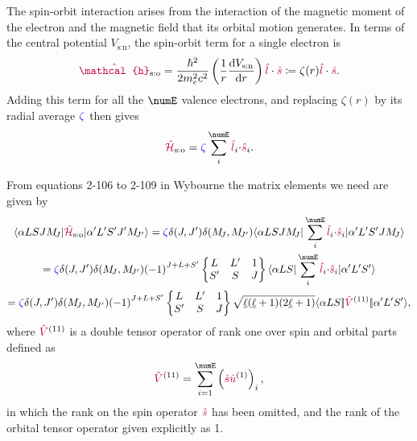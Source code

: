 \documentclass[11pt, twoside,openright]{article}
\begin{document}
	The spin-orbit interaction arises from the interaction of the magnetic moment of the electron and the magnetic field that its orbital motion generates. In terms of the central potential $V_{\text{s:n}}$, the spin-orbit term for a single electron is
    \begin{equation}
        \op{\mathcal{h}}_{\text{s:o}} = \frac{\hbar^2}{2\me^2 c^2} \left(\frac{1}{r}\frac{\mathrm{d}V_{\text{s:n}}}{\mathrm{d}r}\right)\op{l}\cdot{\op{s}} \DEF \zeta{(r)} \op{l}\cdot\op{s}.
    \end{equation}
    Adding this term for all the $\numE$ valence electrons, and replacing $\zeta(r)$ by its radial average $\textcolor{blue}{{\zeta}}$ then gives
    \begin{equation}
    \hamSpinOrbitSymbol = \spinZeta \sum_i^{\numE} \dotp{\op{l}_i}{\op{s}_i}.
    \end{equation}

    From equations 2-106 to 2-109 in Wybourne \cite{wybourne_electrostatic_1963} the matrix elements we need are given by
    \begin{multline} 
        \braopket{\alpha LSJ \Msub{J} }{\hamSpinOrbitSymbol}{\alpha' L'S'J'\Msub{J'}} = 
        \spinZeta
        \kronecker{J}{J'}
        \kronecker{\Msub{J}}{\Msub{J'}}
        \braopket{\alpha LSJ \Msub{J} }{\sum_i^{\numE} \dotp{\op{l}_i}{\op{s}_i}}{\alpha' L'S'J\Msub{J}} \\ 
        = \spinZeta \kronecker{J}{J'}
        \kronecker{\Msub{J}}{\Msub{J'}} \phaser{J+L+S'} 
            \sixj{L}{L'}{1}{S'}{S}{J} 
            \braopket{\alpha LS}{\sum_i^{\numE} \dotp{\op{l}_i}{\op{s}_i}}{\alpha' L'S'} \\
        = \spinZeta \kronecker{J}{J'}
        \kronecker{\Msub{J}}{\Msub{J'}} \phaser{J+L+S'} 
            \sixj{L}{L'}{1}{S'}{S}{J} 
            \sqrt{\lorb (\lorb + 1)(2\lorb + 1)} 
            \redbraopket{\alpha{LS}}{\op{V}^{(11)}}{\alpha'L'S'},
    \end{multline}
where $\textcolor{purple}{\hat{V}}^{(11)}$ is a double tensor operator of rank one over spin and orbital parts defined as 
    \begin{equation}
        \op{V}^{(11)} = \sum_{i=1}^\numE \left( \op{s}\op{u}^{(1)} \right)_i,
    \end{equation}
    in which the rank on the spin operator $\textcolor{purple}{\hat{s}}$ has been omitted, and the rank of the orbital tensor operator given explicitly as 1.
\end{document}
